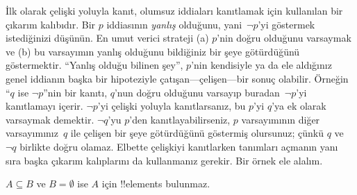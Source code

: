 \documentclass[../../../include/open-logic-section]{subfiles}
\begin{document}


İlk olarak çelişki yoluyla kanıt, olumsuz iddiaları kanıtlamak için
kullanılan bir çıkarım kalıbıdır. Bir $p$ iddiasının \emph{yanlış}
olduğunu, yani~$\lnot p$'yi göstermek istediğinizi düşünün. En umut
verici strateji (a) $p$'nin doğru olduğunu varsaymak ve (b) bu
varsayımın yanlış olduğunu bildiğiniz bir şeye götürdüğünü göstermektir.
``Yanlış olduğu bilinen şey'', $p$'nin kendisiyle ya da ele aldığınız
genel iddianın başka bir hipoteziyle çatışan---çelişen---bir sonuç
  olabilir. Örneğin ``$q$ ise $\lnot p$''nin bir kanıtı, $q$'nun doğru
  olduğunu varsayıp buradan~$\lnot p$'yi kanıtlamayı içerir. $\lnot p$'yi
  çelişki yoluyla kanıtlarsanız, bu $p$'yi $q$'ya ek olarak varsaymak
  demektir. $\lnot q$'yu $p$'den kanıtlayabilirseniz, $p$ varsayımının
diğer varsayımınız~$q$ ile çelişen bir şeye götürdüğünü göstermiş
olursunuz; çünkü $q$ ve $\lnot q$ birlikte doğru olamaz. Elbette
çelişkiyi kanıtlarken tanımları açmanın yanı sıra başka çıkarım
kalıplarını da kullanmanız gerekir. Bir örnek ele alalım.

\begin{prop}
  $A \subseteq B$ ve $B = \emptyset$ ise $A$ için !!{element}s
  bulunmaz.
\end{prop}
\end{document}
